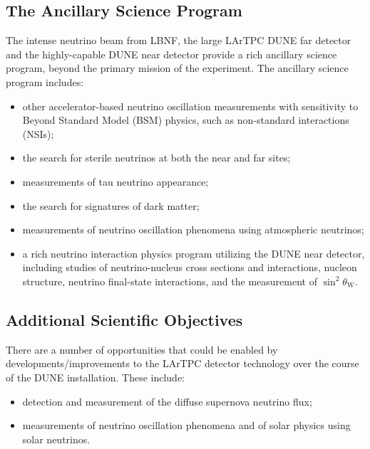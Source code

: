 \subsection{The Ancillary Science Program}

The intense neutrino beam from LBNF, the large LArTPC DUNE far detector and the highly-capable DUNE near detector provide a rich ancillary science program, beyond the primary mission of the experiment. The ancillary science program includes:
\begin{itemize}
     \item other accelerator-based neutrino oscillation measurements with sensitivity to Beyond Standard Model (BSM) physics, such as non-standard interactions (NSIs);
     \item the search for sterile neutrinos at both the near and far sites;
     \item measurements of tau neutrino appearance;
     \item the search for signatures of dark matter; 
     \item measurements of neutrino oscillation phenomena using atmospheric neutrinos;
     \item a rich neutrino interaction physics program utilizing the DUNE near detector, including studies of neutrino-nucleus cross sections and interactions, nucleon structure, neutrino final-state interactions, and the measurement of
 $\sin^2\theta_\text{W}$.     
\end{itemize} 

\subsection{Additional Scientific Objectives}
There are a number of opportunities that could be enabled by developments/improvements to the LArTPC detector technology over the course of the DUNE installation. These include:
\begin{itemize}
      \item detection and measurement of the diffuse supernova neutrino flux;
      \item measurements of neutrino oscillation phenomena and of solar physics using solar neutrinos.
\end{itemize}


 

